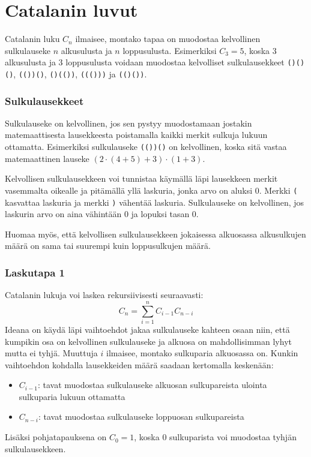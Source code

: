 \section{Catalanin luvut}

Catalanin luku $C_n$ ilmaisee,
montako tapaa on muodostaa kelvollinen sulkulauseke
$n$ alkusulusta ja $n$ loppusulusta.
Esimerkiksi $C_3=5$, koska 3 alkusulusta
ja 3 loppusulusta voidaan muodostaa
kelvolliset sulkulausekkeet
\texttt{()()()}, \texttt{(())()},
\texttt{()(())}, \texttt{((()))} ja \texttt{(()())}.

\subsubsection{Sulkulausekkeet}

Sulkulauseke on kelvollinen, jos sen pystyy
muodostamaan jostakin
matemaattisesta lausekkeesta poistamalla
kaikki merkit sulkuja lukuun ottamatta.
Esimerkiksi sulkulauseke \texttt{(())()}
on kelvollinen, koska sitä vastaa
matemaattinen lauseke $(2 \cdot (4+5)+3)\cdot(1+3)$.

Kelvollisen sulkulausekkeen voi tunnistaa käymällä
läpi lausekkeen merkit vasemmalta oikealle ja
pitämällä yllä laskuria, jonka arvo on aluksi 0.
Merkki \texttt{(} kasvattaa laskuria ja
merkki \texttt{)} vähentää laskuria.
Sulkulauseke on kelvollinen, jos laskurin arvo
on aina vähintään 0 ja lopuksi tasan 0.

Huomaa myös, että kelvollisen sulkulausekkeen
jokaisessa alkuosassa alkusulkujen määrä on
sama tai suurempi kuin loppusulkujen määrä.

\subsubsection{Laskutapa 1}

Catalanin lukuja voi laskea rekursiivisesti seuraavasti:
\[ C_n = \sum_{i=1}^{n} C_{i-1} C_{n-i}\]
Ideana on käydä läpi vaihtoehdot
jakaa sulkulauseke kahteen osaan niin,
että kumpikin osa on kelvollinen sulkulauseke
ja alkuosa on mahdollisimman lyhyt mutta ei tyhjä.
Muuttuja $i$ ilmaisee, montako sulkuparia
alkuosassa on.
Kunkin vaihtoehdon kohdalla lausekkeiden määrä
saadaan kertomalla keskenään:

\begin{itemize}
\item $C_{i-1}$: tavat muodostaa sulkulauseke
alkuosan sulkupareista ulointa sulkuparia lukuun ottamatta
\item $C_{n-i}$: tavat muodostaa sulkulauseke
loppuosan sulkupareista
\end{itemize}
Lisäksi pohjatapauksena on $C_0=1$, koska 0
sulkuparista voi muodostaa
tyhjän sulkulausekkeen.

